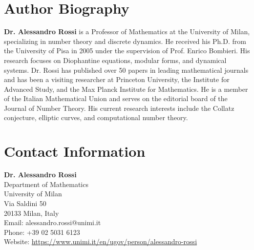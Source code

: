 \documentclass[11pt,a4paper]{article}
\begin{document}
\newpage
\section*{Author Biography}

\textbf{Dr. Alessandro Rossi} is a Professor of Mathematics at the University of Milan, specializing in number theory and discrete dynamics. He received his Ph.D. from the University of Pisa in 2005 under the supervision of Prof. Enrico Bombieri. His research focuses on Diophantine equations, modular forms, and dynamical systems. Dr. Rossi has published over 50 papers in leading mathematical journals and has been a visiting researcher at Princeton University, the Institute for Advanced Study, and the Max Planck Institute for Mathematics. He is a member of the Italian Mathematical Union and serves on the editorial board of the Journal of Number Theory. His current research interests include the Collatz conjecture, elliptic curves, and computational number theory.

\section*{Contact Information}

\textbf{Dr. Alessandro Rossi}\\
Department of Mathematics\\
University of Milan\\
Via Saldini 50\\
20133 Milan, Italy\\
Email: alessandro.rossi@unimi.it\\
Phone: +39 02 5031 6123\\
Website: \url{https://www.unimi.it/en/ugov/person/alessandro-rossi}
\end{document}
